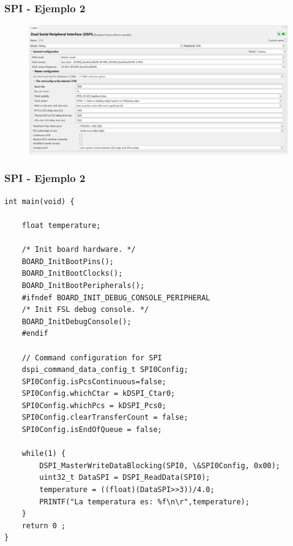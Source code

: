 \documentclass[10.5pt,scale=1.0,t,aspectratio=169,hyperref={pdfpagelabels=false}]{beamer}
\begin{document}
\begin{frame}
	\frametitle{SPI - Ejemplo 2}
	\begin{figure}
		\centering
		\includegraphics[scale=0.4]{20_SPI0Config}
	\end{figure}
\end{frame}
\begin{frame}[fragile]
	\frametitle{SPI - Ejemplo 2}
	\begin{lstlisting}[style=CStyle]
int main(void) {
	
	float temperature;
	
	/* Init board hardware. */
	BOARD_InitBootPins();
	BOARD_InitBootClocks();
	BOARD_InitBootPeripherals();
	#ifndef BOARD_INIT_DEBUG_CONSOLE_PERIPHERAL
	/* Init FSL debug console. */
	BOARD_InitDebugConsole();
	#endif
	
	// Command configuration for SPI
	dspi_command_data_config_t SPI0Config;
	SPI0Config.isPcsContinuous=false;
	SPI0Config.whichCtar = kDSPI_Ctar0;
	SPI0Config.whichPcs = kDSPI_Pcs0;
	SPI0Config.clearTransferCount = false;
	SPI0Config.isEndOfQueue = false;
	
	while(1) {
		DSPI_MasterWriteDataBlocking(SPI0, \&SPI0Config, 0x00);
		uint32_t DataSPI = DSPI_ReadData(SPI0);
		temperature = ((float)(DataSPI>>3))/4.0;
		PRINTF("La temperatura es: %f\n\r",temperature);
	}
	return 0 ;
}
	
	
	\end{lstlisting}
\end{frame}

\frame{
	\begin{center}
		\vspace{3cm}
		\LARGE \textcolor{blue}{COMUNICACIONES I2C \\ (Inter-Integrated Circuit)}
	\end{center}
}
\end{document}
